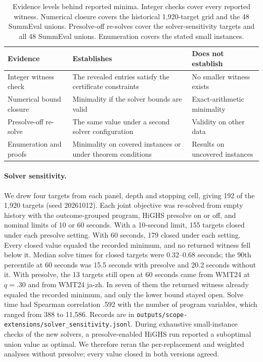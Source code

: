 \begin{table}[t]\centering\small
\begin{tabular}{@{}p{1.9cm}p{2.6cm}p{2.3cm}@{}}\toprule
Evidence & Establishes & Does not establish\\\midrule
Integer witness check & The revealed entries satisfy the certificate constraints & No smaller witness exists\\
Numerical bound closure & Minimality if the solver bounds are valid & Exact-arithmetic minimality\\
Presolve-off re-solve & The same value under a second solver configuration & Validity on other data\\
Enumeration and proofs & Minimality on covered instances or under theorem conditions & Results on uncovered instances\\\bottomrule
\end{tabular}
\caption{Evidence levels behind reported minima. Integer checks cover every reported witness. Numerical closure covers the historical 1,920-target grid and the 48 SummEval unions. Presolve-off re-solves cover the solver-sensitivity targets and all 48 SummEval unions. Enumeration covers the stated small instances.}
\label{tab:evidence-levels}
\end{table}

\paragraph{Solver sensitivity.}
We drew four targets from each panel, depth and stopping cell, giving 192 of the 1,920 targets (seed 20261012). Each joint objective was re-solved from empty history with the outcome-grouped program, HiGHS presolve on or off, and nominal limits of 10 or 60 seconds. With a 10-second limit, 155 targets closed under each presolve setting. With 60 seconds, 179 closed under each setting. Every closed value equaled the recorded minimum, and no returned witness fell below it. Median solve times for closed targets were 0.32--0.68 seconds; the 90th percentile at 60 seconds was 15.5 seconds with presolve and 20.2 seconds without it. With presolve, the 13 targets still open at 60 seconds came from WMT24 at $q=.30$ and from WMT24 ja-zh. In seven of them the returned witness already equaled the recorded minimum, and only the lower bound stayed open. Solve time had Spearman correlation .592 with the number of program variables, which ranged from 388 to 11,586. Records are in \nolinkurl{outputs/scope-extensions/solver_sensitivity.jsonl}. During exhaustive small-instance checks of the new solvers, a presolve-enabled HiGHS run reported a suboptimal union value as optimal. We therefore reran the per-replacement and weighted analyses without presolve; every value closed in both versions agreed.

